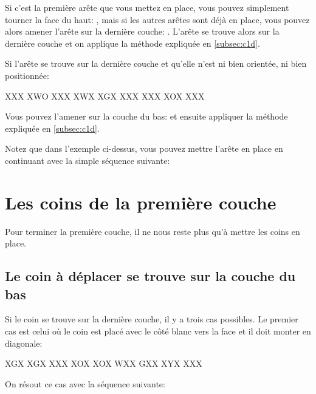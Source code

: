 Si c'est la première arête que vous mettez en place, vous pouvez simplement tourner la face du haut: , mais si les autres arêtes sont déjà en place, vous pouvez alors amener l'arête sur la dernière couche: . L'arête se trouve alors sur la dernière couche et on applique la méthode expliquée en \ref{subsec:c1d}.

Si l'arête se trouve sur la dernière couche et qu'elle n'est ni bien orientée, ni bien positionnée:

\begin{center}
	\RubikFaceUp%
	{X}{X}{X}%
	{X}{W}{O}%
	{X}{X}{X}
	\RubikFaceRight%
	{X}{W}{X}%
	{X}{G}{X}%
	{X}{X}{X}
	\RubikFaceFront%
	{X}{X}{X}%
	{X}{O}{X}%
	{X}{X}{X}
\end{center}

Vous pouvez l'amener sur la couche du bas:  et ensuite appliquer la méthode expliquée en \ref{subsec:c1d}.

Notez que dans l'exemple ci-dessus, vous pouvez mettre l'arête en place en continuant avec la simple séquence suivante: 

\section{Les coins de la première couche}

Pour terminer la première couche, il ne nous reste plus qu'à mettre les coins en place.

\subsection{Le coin à déplacer se trouve sur la couche du bas}
\label{subsec:c1cd}

Si le coin se trouve sur la dernière couche, il y a trois cas possibles.
Le premier cas est celui où le coin est placé avec le côté blanc vers
la face et il doit monter en diagonale: 

\begin{center}  	
	\RubikFaceRight%
	{X}{G}{X}%
	{X}{G}{X}%
	{X}{X}{X}
	\RubikFaceFront%
	{X}{O}{X}%
	{X}{O}{X}%
	{W}{X}{X}
	\RubikFaceDown%
	{G}{X}{X}%
	{X}{Y}{X}%
	{X}{X}{X}
	
\end{center} 

On résout ce cas avec la séquence suivante:

